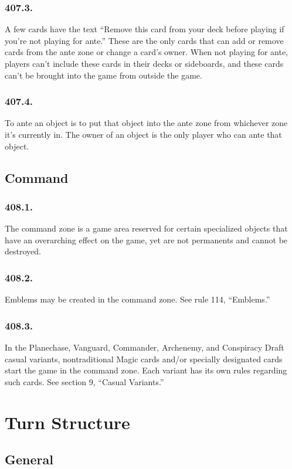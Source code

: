 \subsection*{407.3.}
A few cards have the text “Remove this card from your deck before playing if you’re not playing for ante.” These are the only cards that can add or remove cards from the ante zone or change a card’s owner. When not playing for ante, players can’t include these cards in their decks or sideboards, and these cards can’t be brought into the game from outside the game.

\subsection*{407.4.}
To ante an object is to put that object into the ante zone from whichever zone it’s currently in. The owner of an object is the only player who can ante that object.

\section{Command}
\subsection*{408.1.}
The command zone is a game area reserved for certain specialized objects that have an overarching effect on the game, yet are not permanents and cannot be destroyed.

\subsection*{408.2.}
Emblems may be created in the command zone. See rule 114, “Emblems.”

\subsection*{408.3.}
In the Planechase, Vanguard, Commander, Archenemy, and Conspiracy Draft casual variants, nontraditional Magic cards and/or specially designated cards start the game in the command zone. Each variant has its own rules regarding such cards. See section 9, “Casual Variants.”

\chapter{Turn Structure}
\setcounter{section}{499}
\section{General}
